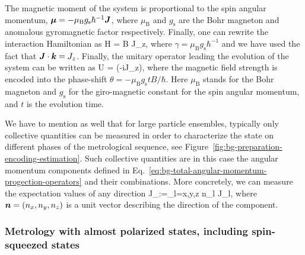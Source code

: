 The magnetic moment of the system is proportional to the spin angular momentum, $\boldsymbol{\mu}=-\mu_\text{B} g_{\text{s}}\hbar^{-1} \boldsymbol{J}$, where $\mu_{\text{B}}$ and $g_{\text{s}}$ are the Bohr magneton and anomalous gyromagnetic factor respectively.
Finally, one can rewrite the interaction Hamiltonian as
\be
  \label{eq:bg-hamiltonian-homogeneous-field}
  H = \gamma B J_z,
\ee
where $\gamma = \mu_\text{B} g_{\text{s}}\hbar^{-1}$ and we have used the fact that $\boldsymbol{J}\cdot\boldsymbol{k}=J_z$.
Finally, the unitary operator leading the evolution of the system can be written as
\be
  \label{eq:bg-unitary-homogeneous-field}
  U = \exp(-i\theta J_z),
\ee
where the magnetic field strength is encoded into the phase-shift $\theta=-\mu_\text{B} g_\text{s} t B/\hbar$.
Here $\mu_\text{B}$ stands for the Bohr magneton and $g_\text{s}$ for the giro-magnetic constant for the spin angular momentum, and $t$ is the evolution time.

We have to mention as well that for large particle ensembles, typically only collective quantities can be measured in order to characterize the state on different phases of the metrological sequence, see Figure~\ref{fig:bg-preparation-encoding-estimation}.
Such collective quantities are in this case the angular momentum components defined in Eq.~\eqref{eq:bg-total-angular-momentum-progection-operators} and their combinations.
More concretely, we can measure the expectation values of any direction
\be
  \label{eq:bg-total-angular-momentum-projector-arbitrary-direction}
  J_{}:=\sum_{l=x,y,z} n_l J_l,
\ee
where $\boldsymbol{n}=(n_x,n_y,n_z)$ is a unit vector describing the direction of the component.

\subsubsection[Metrology with almost polarized states]{Metrology with almost polarized states, including spin-squeezed states}
\label{sec:bg-metrology-with-almost-polarized}

